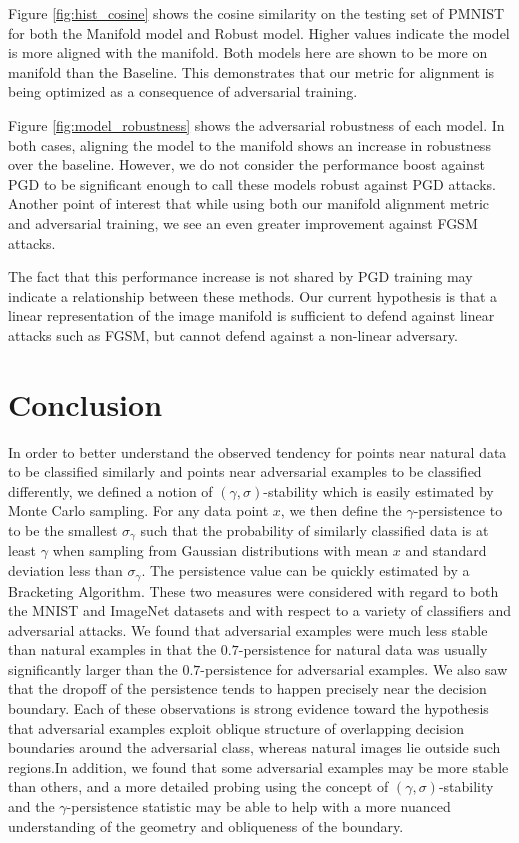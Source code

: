 Figure \ref{fig:hist_cosine} shows the cosine similarity on the testing set of PMNIST for both the Manifold model and Robust model.
Higher values indicate the model is more aligned with the manifold.
Both models here are shown to be more on manifold than the Baseline.
This demonstrates that our metric for alignment is being optimized as a consequence of adversarial training.

Figure \ref{fig:model_robustness} shows the adversarial robustness of each model.
In both cases, aligning the model to the manifold shows an increase in robustness over the baseline.
However, we do not consider the performance boost against PGD to be significant enough to call these models robust against PGD attacks.
Another point of interest that while using both our manifold alignment metric and adversarial training, we see an even greater improvement against FGSM attacks.

The fact that this performance increase is not shared by PGD training may indicate a relationship between these methods.
Our current hypothesis is that a linear representation of the image manifold is sufficient to defend against linear attacks such as FGSM, but cannot defend against a non-linear adversary.

\section{Conclusion}

In order to better understand the observed tendency for points near natural data to be classified similarly and points near
adversarial examples to be classified differently, we defined a notion of $(\gamma,\sigma)$-stability which is easily estimated by Monte Carlo sampling. For any data point $x$, we then define the $\gamma$-persistence to to be the smallest $\sigma_\gamma$ such that the probability of similarly classified data is at least $\gamma$ when sampling from Gaussian distributions with mean $x$ and standard deviation less than $\sigma_\gamma$. The persistence value can be quickly estimated by a Bracketing Algorithm. These two measures were considered with regard to both the MNIST and ImageNet datasets and with respect to a variety of classifiers and adversarial attacks. We found that adversarial examples were much less stable than natural examples in that the $0.7$-persistence for natural data was usually significantly larger than the $0.7$-persistence for adversarial examples. We also saw that the dropoff of the persistence tends to happen precisely near the decision boundary. Each of these observations is strong evidence toward the hypothesis that adversarial examples exploit oblique structure of overlapping decision boundaries around the adversarial class, whereas natural images lie outside such regions.In addition, we found that some adversarial examples may be more stable than others, and a more detailed probing using the concept of $(\gamma,\sigma)$-stability and the $\gamma$-persistence statistic may be able to help with a more nuanced understanding of the geometry and obliqueness of the boundary.

